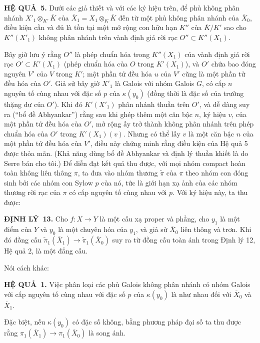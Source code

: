 \documentclass[11pt,twoside,openany]{book}
\numberwithin{equation}{section}
\newcommand{\src}[1]{%
  \phantomsection\hypertarget{src:\fgasourceid:#1}{}%
  \marginpar{\raggedleft\footnotesize\sffamily #1}%
}
\newcommand{\fgasourceid}{unset}
\newcommand{\result}[2]{\par\medskip\noindent\textbf{#1\if\relax\detokenize{#2}\relax\else\ #2\fi.}\quad}
\begin{document}
\src{218}
\result{HỆ QUẢ}{5} Dưới các giả thiết và với các ký hiệu trên, để phủ không
phân nhánh $X'_1\otimes_{K'}\overline K$ của
$\overline X_1=X_1\otimes_K\overline K$ đến từ một phủ không phân nhánh của
$\overline X_0$, điều kiện cần và đủ là tồn tại một mở rộng con hữu hạn $K''$
của $\overline K/K'$ sao cho $K''(X'_1)$ không phân nhánh trên vành định giá
rời rạc $O''\subset K''(X_1)$.

Bây giờ lưu ý rằng $O''$ là phép chuẩn hóa trong $K''(X_1)$ của vành định giá
rời rạc $O'\subset K'(X_1)$ (phép chuẩn hóa của $O$ trong $K'(X_1)$), và
$O'$ chứa bao đóng nguyên $V'$ của $V$ trong $K'$; một phần tử đều hóa $u$ của
$V'$ cũng là một phần tử đều hóa của $O'$. Giả sử bây giờ $X'_1$ là Galois với
nhóm Galois $G$, có cấp $n$ nguyên tố cùng nhau với đặc số $p$ của
$\kappa(y_0)$ (đồng thời là đặc số của trường thặng dư của $O'$). Khi đó
$K'(X'_1)$ phân nhánh thuần trên $O'$, và dễ dàng suy ra (“bổ đề Abhyankar”)
rằng sau khi ghép thêm một căn bậc $n$, ký hiệu $v$, của một phần tử đều hóa
của $O'$, mở rộng ấy trở thành không phân nhánh trên phép chuẩn hóa của $O'$
trong $K'(X_1)(v)$. Nhưng có thể lấy $v$ là một căn bậc $n$ của một phần tử
đều hóa của $V'$, điều này chứng minh rằng điều kiện của Hệ quả 5 được thỏa
mãn. (Khả năng dùng bổ đề Abhyankar và định lý thuần khiết là do Serre bán cho
tôi.) Để diễn đạt kết quả thu được, với mọi nhóm compact hoàn toàn không liên
thông $\pi$, ta đưa vào nhóm thương $\widetilde\pi$ của $\pi$ theo nhóm con
đóng sinh bởi các nhóm con Sylow $p$ của nó, tức là giới hạn xạ ảnh của các
nhóm thương rời rạc của $\pi$ có cấp nguyên tố cùng nhau với $p$. Với ký hiệu
này, ta thu được:

\result{ĐỊNH LÝ}{13} Cho $f:X\longrightarrow Y$ là một cấu xạ proper và
phẳng, cho $y_1$ là một điểm của $Y$ và $y_0$ là một chuyên hóa của $y_1$, và
giả sử $\overline X_0$ liên thông và trơn. Khi đó đồng cấu
$\widetilde\pi_1(\overline X_1)\longrightarrow
\widetilde\pi_1(\overline X_0)$ suy ra từ đồng cấu toàn ánh trong Định lý 12,
Hệ quả 2, là một đẳng cấu.

Nói cách khác:

\src{219}
\result{HỆ QUẢ}{1} Việc phân loại các phủ Galois không phân nhánh có nhóm
Galois với cấp nguyên tố cùng nhau với đặc số $p$ của $\kappa(y_0)$ là như
nhau đối với $\overline X_0$ và $\overline X_1$.

Đặc biệt, nếu $\kappa(y_0)$ có đặc số không, bằng phương pháp đại số ta thu
được rằng $\pi_1(\overline X_1)\longrightarrow\pi_1(\overline X_0)$ là song
ánh.
\end{document}
